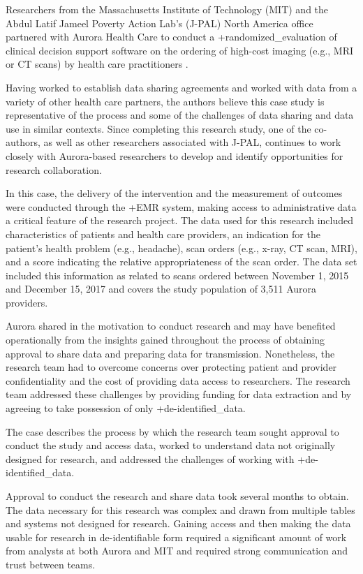 \documentclass[
]{book}
\begin{document}
Researchers from the Massachusetts Institute of Technology (MIT) and the Abdul Latif Jameel Poverty Action Lab's (J-PAL) North America office partnered with Aurora Health Care to conduct a +randomized\_evaluation\textbar{} of clinical decision support software on the ordering of high-cost imaging (e.g., MRI or CT scans) by health care practitioners \citep{doyle2019}.

Having worked to establish data sharing agreements and worked with data from a variety of other health care partners, the authors believe this case study is representative of the process and some of the challenges of data sharing and data use in similar contexts. Since completing this research study, one of the co-authors, as well as other researchers associated with J-PAL, continues to work closely with Aurora-based researchers to develop and identify opportunities for research collaboration.

In this case, the delivery of the intervention and the measurement of outcomes were conducted through the +EMR\textbar{} system, making access to administrative data a critical feature of the research project. The data used for this research included characteristics of patients and health care providers, an indication for the patient's health problem (e.g., headache), scan orders (e.g., x-ray, CT scan, MRI), and a score indicating the relative appropriateness of the scan order. The data set included this information as related to scans ordered between November 1, 2015 and December 15, 2017 and covers the study population of 3,511 Aurora providers.

Aurora shared in the motivation to conduct research and may have benefited operationally from the insights gained throughout the process of obtaining approval to share data and preparing data for transmission. Nonetheless, the research team had to overcome concerns over protecting patient and provider confidentiality and the cost of providing data access to researchers. The research team addressed these challenges by providing funding for data extraction and by agreeing to take possession of only +de-identified\_data\textbar.

The case describes the process by which the research team sought approval to conduct the study and access data, worked to understand data not originally designed for research, and addressed the challenges of working with +de-identified\_data\textbar.

Approval to conduct the research and share data took several months to obtain. The data necessary for this research was complex and drawn from multiple tables and systems not designed for research. Gaining access and then making the data usable for research in de-identifiable form required a significant amount of work from analysts at both Aurora and MIT and required strong communication and trust between teams.
\end{document}

